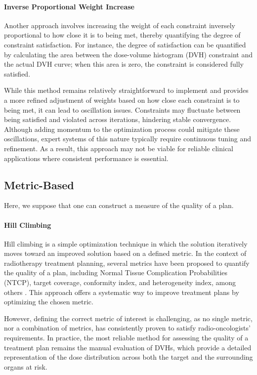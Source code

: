 \paragraph{Inverse Proportional Weight Increase}
Another approach involves increasing the weight of each constraint inversely proportional to how close it is to being met, thereby quantifying the degree of constraint satisfaction.
For instance, the degree of satisfaction can be quantified by calculating the area between the dose-volume histogram (DVH) constraint and the actual DVH curve; when this area is zero, the constraint is considered fully satisfied.

While this method remains relatively straightforward to implement and provides a more refined adjustment of weights based on how close each constraint is to being met, it can lead to oscillation issues.
Constraints may fluctuate between being satisfied and violated across iterations, hindering stable convergence.
Although adding momentum to the optimization process could mitigate these oscillations, expert systems of this nature typically require continuous tuning and refinement.
As a result, this approach may not be viable for reliable clinical applications where consistent performance is essential.

\subsection{Metric-Based}
Here, we suppose that one can construct a measure of the quality of a plan.

\paragraph{Hill Climbing}
Hill climbing \cite{skienna2008} is a simple optimization technique in which the solution iteratively moves toward an improved solution based on a defined metric.
In the context of radiotherapy treatment planning, several metrics have been proposed to quantify the quality of a plan, including Normal Tissue Complication Probabilities (NTCP), target coverage, conformity index, and heterogeneity index, among others \cite{lyman_normal_1992,li_input_2022} \label{metrics}.
This approach offers a systematic way to improve treatment plans by optimizing the chosen metric.

However, defining the correct metric of interest is challenging, as no single metric, nor a combination of metrics, has consistently proven to satisfy radio-oncologists' requirements.
In practice, the most reliable method for assessing the quality of a treatment plan remains the manual evaluation of DVHs, which provide a detailed representation of the dose distribution across both the target and the surrounding organs at risk.

